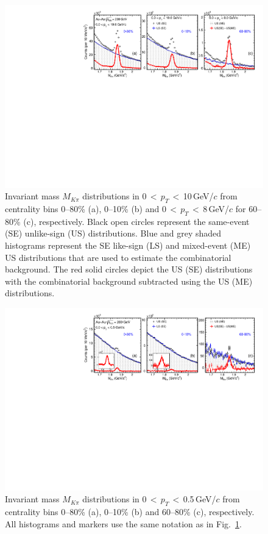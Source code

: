 \documentclass[%
 reprint,	
 amsmath,amssymb,
 aps,
 prc,
]{revtex4-1}
\begin{document}
\begin{figure}
\centering
\includegraphics[width=1.0\textwidth]{fig/signal_0_8_10GeV.pdf}
\caption{Invariant mass $M_{K\pi}$ distributions in 0\,$<$\,$p_{T}$\,$<$\,10\,GeV/$c$ from centrality bins 0--80\% (a), 0--10\% (b) and 0\,$<$\,$p_{T}$\,$<$\,8\,GeV/$c$ for 60--80\% (c), respectively. Black open circles represent the same-event (SE) unlike-sign (US) distributions. Blue and grey shaded histograms represent the SE like-sign (LS) and mixed-event (ME) US distributions that are used to estimate the combinatorial background. The red solid circles depict the US (SE) distributions with the combinatorial background subtracted using the US (ME) distributions.
}
\label{fig:signal_0} 
\end{figure}

\begin{figure}
\centering
\includegraphics[width=1.0\textwidth]{fig/signal2_0_05GeV.pdf}
\caption{Invariant mass $M_{K\pi}$ distributions in 0\,$<$\,$p_{T}$\,$<$\,0.5\,GeV/$c$ from centrality bins 0--80\% (a), 0--10\% (b) and 60--80\% (c), respectively. All histograms and markers use the same notation as in Fig.~\ref{fig:signal_0}.}
\label{fig:signal_1} 
\end{figure}
\end{document}
